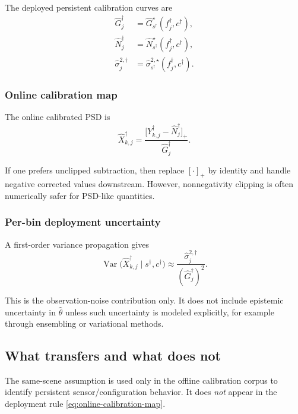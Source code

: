 The deployed persistent calibration curves are
\begin{align}
\widehat G^\dagger_j
&=
\widehat G_{s^\dagger}^\star(f^\dagger_j,c^\dagger),
\label{eq:deployed-Gdag}
\\
\widehat N^\dagger_j
&=
\widehat N_{s^\dagger}^\star(f^\dagger_j,c^\dagger),
\label{eq:deployed-Ndag}
\\
\widehat \sigma^{2,\dagger}_j
&=
\widehat \sigma_{s^\dagger}^{2,\star}(f^\dagger_j,c^\dagger).
\label{eq:deployed-sigdag}
\end{align}

\subsubsection{Online calibration map}

The online calibrated PSD is
\begin{equation}
\widehat X^\dagger_{k,j}
=
\frac{
\bigl[
Y^\dagger_{k,j}
-
\widehat N^\dagger_j
\bigr]_+
}{
\widehat G^\dagger_j
}.
\label{eq:online-calibration-map}
\end{equation}

If one prefers unclipped subtraction, then replace $[\cdot]_+$ by identity and
handle negative corrected values downstream. However, nonnegativity clipping is
often numerically safer for PSD-like quantities.

\subsubsection{Per-bin deployment uncertainty}

A first-order variance propagation gives
\begin{equation}
\operatorname{Var}
\bigl(
\widehat X^\dagger_{k,j}
\mid
s^\dagger,c^\dagger
\bigr)
\approx
\frac{
\widehat \sigma^{2,\dagger}_j
}{
(\widehat G^\dagger_j)^2
}.
\label{eq:deployment-variance}
\end{equation}

This is the observation-noise contribution only. It does not include
epistemic uncertainty in $\widehat\theta$ unless such uncertainty is modeled
explicitly, for example through ensembling or variational methods.

\subsection{What transfers and what does not}

The same-scene assumption is used only in the offline calibration corpus to
identify persistent sensor/configuration behavior. It does \emph{not} appear in
the deployment rule \eqref{eq:online-calibration-map}.

